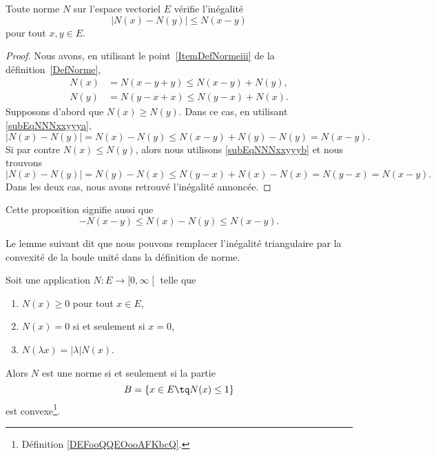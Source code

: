 \begin{proposition}		\label{PropNmNNm}
	Toute norme \( N\) sur l'espace vectoriel \( E\) vérifie l'inégalité
	\begin{equation}
		\big| N(x)-N(y) \big|\leq N(x-y)
	\end{equation}
	pour tout \( x,y\in E\).
\end{proposition}

\begin{proof}
	Nous avons, en utilisant le point~\ref{ItemDefNormeiii} de la définition~\ref{DefNorme},
	\begin{subequations}
		\begin{align}
			N(x) & =N(x-y+y)\leq N(x-y)+N(y),	\label{subEqNNNxxyyya} \\
			N(y) & =N(y-x+x)\leq N(y-x)+N(x).	\label{subEqNNNxxyyyb}
		\end{align}
	\end{subequations}
	Supposons d'abord que \( N(x)\geq N(y)\). Dans ce cas, en utilisant \eqref{subEqNNNxxyyya},
	\begin{equation}
		\big| N(x)-N(y) \big|=N(x)-N(y)\leq N(x-y)+N(y)-N(y)=N(x-y).
	\end{equation}
	Si par contre \( N(x)\leq N(y)\), alors nous utilisons \eqref{subEqNNNxxyyyb} et nous trouvons
	\begin{equation}
		\big| N(x)-N(y) \big|=N(y)-N(x)\leq N(y-x)+N(x)-N(x)=N(y-x)=N(x-y).
	\end{equation}
	Dans les deux cas, nous avons retrouvé l'inégalité annoncée.
\end{proof}
Cette proposition signifie aussi que
\begin{equation}	\label{EqNleqNNleqNvqlqbs}
	-N(x-y)\leq N(x)-N(y)\leq N(x-y).
\end{equation}

Le lemme suivant dit que nous pouvons remplacer l'inégalité triangulaire par la convexité de la boule unité dans la définition de norme.
\begin{lemma}     \label{LEMooAVIJooFhdXXr}
	Soit une application \( N\colon E\to \mathopen[ 0 , \infty \mathclose[\) telle que
	\begin{enumerate}
		\item
		      \( N(x)\geq 0\) pour tout \( x\in E\),
		\item
		      \( N(x)=0\) si et seulement si \( x=0\),
		\item
		      \( N(\lambda x)=| \lambda | N(x)\).
	\end{enumerate}
	Alors \( N\) est une norme si et seulement si la partie
	\begin{equation}
		B = \{ x\in E\tq N(x)\leq 1 \}
	\end{equation}
	est convexe\footnote{Définition \ref{DEFooQQEOooAFKbcQ}.}.
\end{lemma}

